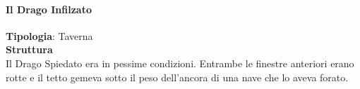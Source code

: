 \documentclass{article}
\begin{document}
                  \paragraph{}
                  \paragraph{Il Drago Infilzato} 
                    \textbf{Tipologia}: Taverna \\
                    \textbf{Struttura}\\
                    Il Drago Spiedato era in pessime condizioni. Entrambe le finestre anteriori erano rotte e il tetto gemeva sotto il peso dell'ancora di una nave che lo aveva forato.
                  \paragraph{}
                  \paragraph{}
                  \paragraph{}
                  \paragraph{}
                  \paragraph{}
                  \paragraph{}
                  \paragraph{}
                  \paragraph{}
                  \paragraph{}
                  \paragraph{}
\end{document}

